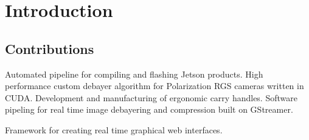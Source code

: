 \chapter{Introduction}

\section{Contributions}
Automated pipeline for compiling and flashing Jetson products.
High performance custom debayer algorithm for Polarization RGS cameras written in CUDA.
Development and manufacturing of ergonomic carry handles.
Software pipeling for real time image debayering and compression built on GStreamer.

Framework for creating real time graphical web interfaces.
